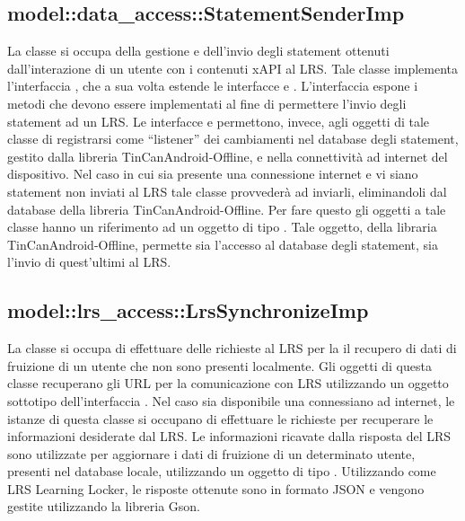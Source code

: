 \documentclass[../Tesi.tex]{subfiles}
\begin{document}
		\subsection{model::data\_access::StatementSenderImp}
		La classe  si occupa della gestione e dell'invio degli statement ottenuti dall'interazione di un utente con i contenuti xAPI al LRS. Tale classe implementa l'interfaccia , che a sua volta estende le interfacce  e . L'interfaccia  espone i metodi che devono essere implementati al fine di permettere l'invio degli statement ad un LRS. Le interfacce  e  permettono, invece, agli oggetti di tale classe di registrarsi come ``listener'' dei cambiamenti nel database degli statement, gestito dalla libreria TinCanAndroid-Offline, e nella connettività ad internet del dispositivo. Nel caso in cui sia presente una connessione internet e vi siano statement non inviati al LRS tale classe provvederà ad inviarli, eliminandoli dal database della libreria TinCanAndroid-Offline. Per fare questo gli oggetti a tale classe hanno un riferimento ad un oggetto di tipo . Tale oggetto, della libraria TinCanAndroid-Offline, permette sia l'accesso al database degli statement, sia l'invio di quest'ultimi al LRS.

		\subsection{model::lrs\_access::LrsSynchronizeImp}
		La classe  si occupa di effettuare delle richieste al LRS per la 
		il recupero di dati di fruizione di un utente che non sono presenti localmente. Gli oggetti di questa classe recuperano gli URL per la comunicazione con LRS utilizzando un oggetto sottotipo dell'interfaccia . Nel caso sia disponibile una connessiano ad internet, le istanze di questa classe si occupano di effettuare le richieste per recuperare le informazioni desiderate dal LRS. Le informazioni ricavate dalla risposta del LRS sono utilizzate per aggiornare i dati di fruizione di un determinato utente, presenti nel database locale, utilizzando un oggetto di tipo . Utilizzando come LRS Learning Locker, le risposte ottenute sono in formato JSON e vengono gestite utilizzando la libreria Gson.
\end{document}
